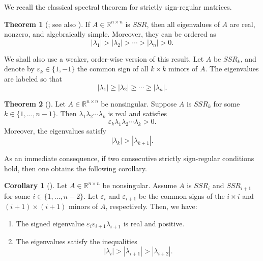 \documentclass[preprint,3p,10pt]{elsarticle}
\theoremstyle{definition}
\newtheorem{theorem}{Theorem}[section]
\newtheorem{corollary}[definition]{Corollary}
\begin{document}
We recall the classical spectral theorem for strictly
sign-regular matrices.

\begin{theorem}[{\cite[Section 3.3]{AlseidiMargaliotGarloff2019}; see also \cite[Chapter V]{GantmacherKrein2002}}]\label{thm:GK}
If \(A\in\mathbb{R}^{n\times n}\) is \(SSR\), then
all eigenvalues of \(A\) are real, nonzero, and algebraically simple. Moreover,
they can be ordered as
\begin{equation}
    |\lambda_1|>|\lambda_2|>\cdots>|\lambda_n|>0.
\end{equation}
\end{theorem}

We shall also use a weaker, order-wise version of this result. Let \(A\) be
\(SSR_k\), and denote by \(\varepsilon_k\in\{1,-1\}\) the common sign of all
\(k\times k\) minors of \(A\). The eigenvalues are labeled so that
\begin{equation}
    |\lambda_1|\ge |\lambda_2|\ge \cdots \ge |\lambda_n|.
\end{equation}

\begin{theorem}[\cite{AlseidiMargaliotGarloff2019}]\label{thm:SSRk}
Let \(A\in\mathbb{R}^{n\times n}\) be nonsingular. Suppose \(A\) is
\(SSR_k\) for some \(k\in\{1,\ldots,n-1\}\). Then
\(\lambda_1\lambda_2\cdots\lambda_k\) is real and satisfies
\begin{equation}
    \varepsilon_k\lambda_1\lambda_2\cdots\lambda_k>0.
\end{equation}
Moreover,  the eigenvalues satisfy
\begin{equation}
    |\lambda_k|>|\lambda_{k+1}|.
\end{equation}
\end{theorem}

As an immediate consequence, if two consecutive strictly sign-regular conditions hold, then one obtains the following corollary.

\begin{corollary}[\cite{AlseidiMargaliotGarloff2019}]\label{cor:SSR-consecutive}
Let \(A\in\mathbb{R}^{n\times n}\) be nonsingular. Assume \(A\) is
\(SSR_i\) and \(SSR_{i+1}\) for some \(i\in\{1,\ldots,n-2\}\). Let
\(\varepsilon_i\) and \(\varepsilon_{i+1}\) be the common signs of the
\(i\times i\) and \((i+1)\times(i+1)\) minors of \(A\), respectively. Then, we have:
\begin{enumerate}
    \item[(a)] The signed eigenvalue \(\varepsilon_i\varepsilon_{i+1}\lambda_{i+1}\) is real and positive.
    \item[(b)] The eigenvalues satisfy the inequalities
    \begin{equation}
    |\lambda_i|>|\lambda_{i+1}|>|\lambda_{i+2}|.
\end{equation}
\end{enumerate}

\end{corollary}
\end{document}

